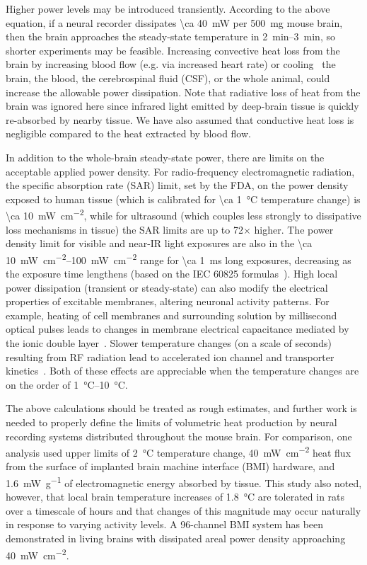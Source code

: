 Higher power levels may be introduced transiently.
According to the above equation, if a neural recorder dissipates \SI{\ca 40}{\milli\watt} per \SI{500}{\milli\gram} mouse brain, then the brain approaches the steady-state temperature in \SIrange{2}{3}{\minute}, so shorter experiments may be feasible.
Increasing convective heat loss from the brain by increasing blood flow (e.g. via increased heart rate) or cooling~\cite{polderman2004} the brain, the blood, the cerebrospinal fluid (CSF), or the whole animal, could increase the allowable power dissipation.
Note that radiative loss of heat from the brain was ignored here since infrared light emitted by deep-brain tissue is quickly re-absorbed by nearby tissue.
We have also assumed that conductive heat loss is negligible compared to the heat extracted by blood flow.

In addition to the whole-brain steady-state power, there are limits on the acceptable applied power density.
For radio-frequency electromagnetic radiation, the specific absorption rate (SAR) limit, set by the FDA, on the power density exposed to human tissue (which is calibrated for \SI{\ca 1}{\celsius} temperature change) is \SI{\ca 10}{\milli\watt\per\centi\meter\squared}, while for ultrasound (which couples less strongly to dissipative loss mechanisms in tissue) the SAR limits are up to 72$\times$ higher.
The power density limit for visible and near-IR light exposures are also in the \SIrange{\ca 10}{100}{\milli\watt\per\centi\meter\squared} range for \SI{\ca 1}{\milli\second} long exposures, decreasing as the exposure time lengthens (based on the IEC 60825 formulas~\cite{iec60825}).
High local power dissipation (transient or steady-state) can also modify the electrical properties of excitable membranes, altering neuronal activity patterns.
For example, heating of cell membranes and surrounding solution by millisecond optical pulses leads to changes in membrane electrical capacitance mediated by the ionic double layer~\cite{shapiro12}.
Slower temperature changes (on a scale of seconds) resulting from RF radiation lead to accelerated ion channel and transporter kinetics~\cite{shapiro13}.
Both of these effects are appreciable when the temperature changes are on the order of \SIrange{1}{10}{\degreeCelsius}.

The above calculations should be treated as rough estimates, and further work is needed to properly define the limits of volumetric heat production by neural recording systems distributed throughout the mouse brain. For comparison, one analysis \cite{Wolf2008} used upper limits of \SI{2}{\celsius} temperature change, \SI{40}{\milli\watt\per\centi\meter\squared} heat flux from the surface of implanted brain machine interface (BMI) hardware, and \SI{1.6}{\milli\watt\per\gram} of electromagnetic energy absorbed by tissue. This study also noted, however, that local brain temperature increases of \SI{1.8}{\celsius} are tolerated in rats over a timescale of hours and that changes of this magnitude may occur naturally in response to varying activity levels. A 96-channel BMI system has been demonstrated in living brains \cite{rizk2009} with dissipated areal power density approaching \SI{40}{\milli\watt\per\centi\meter\squared}.

